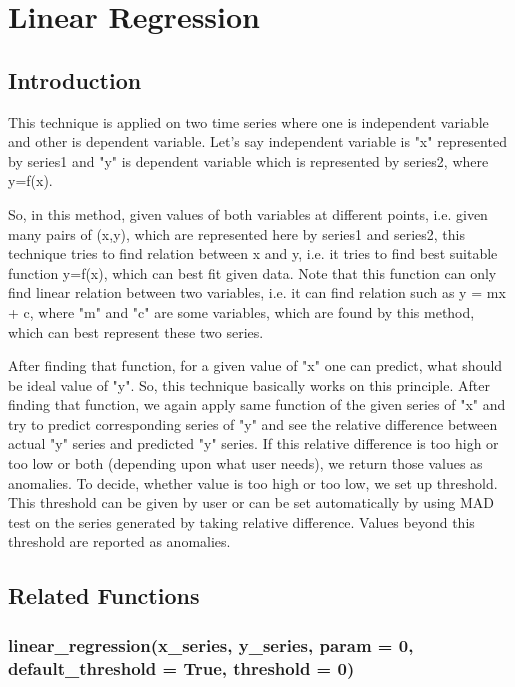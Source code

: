 \chapter{Linear Regression}

\section{Introduction}

This technique is applied on two time series where one is independent variable 
and other is dependent variable. Let's say independent variable 
is "x" represented by series1 and "y" is dependent variable which is 
represented by series2, where y=f(x). 

So, in this method, given values of both variables at different points, i.e. 
given many pairs of (x,y), which are represented here by series1 and series2, 
this technique tries to find relation between x and y, i.e. it tries to find 
best suitable function y=f(x), which can best fit given data. Note that this 
function can only find linear relation between two variables, i.e. it can find 
relation such as y = mx + c, where "m" and "c" are some variables, which are 
found by this method, which can best represent these two series. 

After finding that function, for a given value of "x" one can predict, what 
should be ideal value of "y". So, this technique basically works on this 
principle. After finding that function, we again apply same function of the 
given series of "x" and try to predict corresponding series of "y" and see the 
relative difference between actual "y" series and predicted "y" series. If this 
relative difference is too high or too low or both (depending upon 
what user needs), we return those values as anomalies. To decide, whether value 
is too high or too low, we set up threshold. This threshold can be given by user 
or can be set automatically by using MAD test on the series generated by taking 
relative difference. Values beyond this threshold are reported as anomalies.

\section{Related Functions}

\subsection{linear\_regression(x\_series, y\_series, param = 0, 
default\_threshold = True, threshold = 0)}

